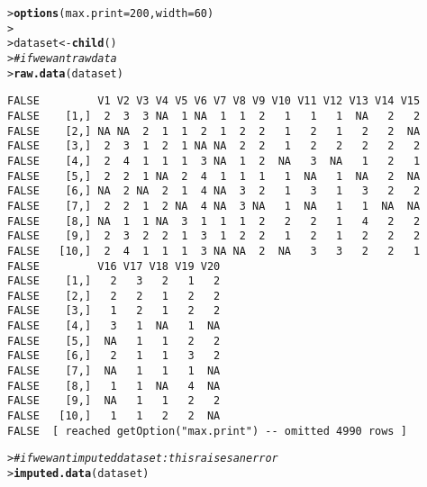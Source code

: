 \documentclass{article}\usepackage[]{graphicx}\usepackage[]{color}
\makeatletter
\newcommand{\hlnum}[1]{\textcolor[rgb]{0.686,0.059,0.569}{#1}}%
\newcommand{\hlcom}[1]{\textcolor[rgb]{0.678,0.584,0.686}{\textit{#1}}}%
\newcommand{\hlstd}[1]{\textcolor[rgb]{0.345,0.345,0.345}{#1}}%
\newcommand{\hlkwb}[1]{\textcolor[rgb]{0.69,0.353,0.396}{#1}}%
\newcommand{\hlkwc}[1]{\textcolor[rgb]{0.333,0.667,0.333}{#1}}%
\newcommand{\hlkwd}[1]{\textcolor[rgb]{0.737,0.353,0.396}{\textbf{#1}}}%
\newenvironment{kframe}{%
 \def\at@end@of@kframe{}%
 \ifinner\ifhmode%
  \def\at@end@of@kframe{\end{minipage}}%
  \begin{minipage}{\columnwidth}%
 \fi\fi%
 \def\FrameCommand##1{\hskip\@totalleftmargin \hskip-\fboxsep
 \colorbox{shadecolor}{##1}\hskip-\fboxsep
     \hskip-\linewidth \hskip-\@totalleftmargin \hskip\columnwidth}%
 \MakeFramed {\advance\hsize-\width
   \@totalleftmargin\z@ \linewidth\hsize
   \@setminipage}}%
 {\par\unskip\endMakeFramed%
 \at@end@of@kframe}
\newenvironment{knitrout}{}{} %
\makeatother
\begin{document}
\begin{knitrout}
\color{fgcolor}\begin{kframe}
\begin{alltt}
\hlstd{> }\hlkwd{options}\hlstd{(}\hlkwc{max.print} \hlstd{=} \hlnum{200}\hlstd{,} \hlkwc{width} \hlstd{=} \hlnum{60}\hlstd{)}
\hlstd{> }
\hlstd{> }\hlstd{dataset} \hlkwb{<-} \hlkwd{child}\hlstd{()}
\hlstd{> }\hlcom{# if we want raw data}
\hlstd{> }\hlkwd{raw.data}\hlstd{(dataset)}
\end{alltt}
\begin{verbatim}
FALSE         V1 V2 V3 V4 V5 V6 V7 V8 V9 V10 V11 V12 V13 V14 V15
FALSE    [1,]  2  3  3 NA  1 NA  1  1  2   1   1   1  NA   2   2
FALSE    [2,] NA NA  2  1  1  2  1  2  2   1   2   1   2   2  NA
FALSE    [3,]  2  3  1  2  1 NA NA  2  2   1   2   2   2   2   2
FALSE    [4,]  2  4  1  1  1  3 NA  1  2  NA   3  NA   1   2   1
FALSE    [5,]  2  2  1 NA  2  4  1  1  1   1  NA   1  NA   2  NA
FALSE    [6,] NA  2 NA  2  1  4 NA  3  2   1   3   1   3   2   2
FALSE    [7,]  2  2  1  2 NA  4 NA  3 NA   1  NA   1   1  NA  NA
FALSE    [8,] NA  1  1 NA  3  1  1  1  2   2   2   1   4   2   2
FALSE    [9,]  2  3  2  2  1  3  1  2  2   1   2   1   2   2   2
FALSE   [10,]  2  4  1  1  1  3 NA NA  2  NA   3   3   2   2   1
FALSE         V16 V17 V18 V19 V20
FALSE    [1,]   2   3   2   1   2
FALSE    [2,]   2   2   1   2   2
FALSE    [3,]   1   2   1   2   2
FALSE    [4,]   3   1  NA   1  NA
FALSE    [5,]  NA   1   1   2   2
FALSE    [6,]   2   1   1   3   2
FALSE    [7,]  NA   1   1   1  NA
FALSE    [8,]   1   1  NA   4  NA
FALSE    [9,]  NA   1   1   2   2
FALSE   [10,]   1   1   2   2  NA
FALSE  [ reached getOption("max.print") -- omitted 4990 rows ]
\end{verbatim}
\begin{alltt}
\hlstd{> }\hlcom{# if we want imputed dataset: this raises an error}
\hlstd{> }\hlkwd{imputed.data}\hlstd{(dataset)}
\end{alltt}



\end{kframe}
\end{knitrout}
\end{document}
